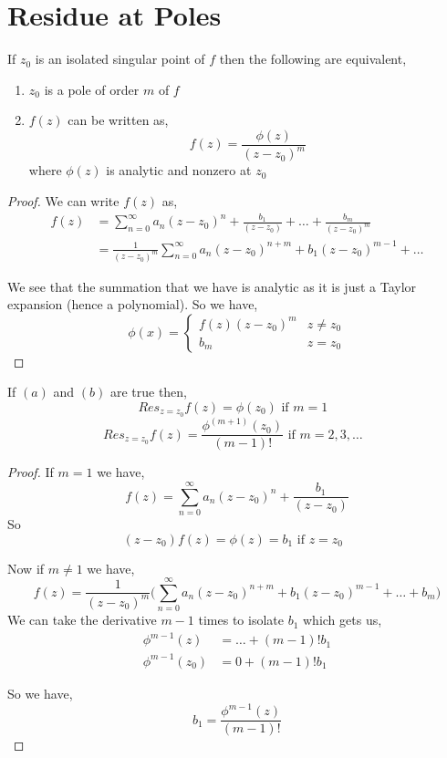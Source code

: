 \section{Residue at Poles}
\begin{theorem}
   If $z_0$ is an isolated singular point of $f$ then the following are equivalent, 
   \begin{enumerate}
      \item $z_0$ is a pole of order $m$ of $f$ 
      \item $f(z) $ can be written as, 
      $$ f(z) = \frac{\phi(z)}{(z - z_0)^{m}} $$ 
      where $\phi(z)$ is analytic and nonzero at $z_0$
   \end{enumerate}
\end{theorem}
\begin{proof}
   We can write $f(z)$ as, 
   \begin{align*}
      f(z) &= \sum_{n=0}^{\infty} a_n(z - z_0)^{n} + \frac{b_1}{(z - z_0)} + \dots + \frac{b_m}{(z - z_0)^{m}}\\
           &= \frac{1}{(z - z_0)^{m}} \sum_{n=0}^{\infty} a_n(z - z_0)^{n+m} + b_1(z - z_0)^{m-1} + \dots
   \end{align*}

   We see that the summation that we have is analytic as it is just a Taylor expansion (hence a polynomial). So we have, 
   $$ \phi(x) = \begin{cases} f(z) (z - z_0)^{m} &  z \ne z_0 \\ b_m &  z = z_0 \end{cases}  $$ 


\end{proof}

\begin{theorem}
   If $(a)$ and $(b)$ are true then, 
   $$ Res_{z = z_0} f(z) = \phi(z_0)\text{ if $m = 1$ }$$
   $$ Res_{z = z_0} f(z) = \frac{\phi^{(m+1)}(z_0)}{(m-1)!} \text{ if $m = 2,3,\dots$ }$$
\end{theorem}

\begin{proof}
   If $m = 1$ we have, 
   $$ f(z) = \sum_{n=0}^{\infty} a_n(z - z_0)^{n} + \frac{b_1}{(z - z_0)} $$ 
   So 
   $$ (z - z_0)f(z) =\phi(z) = b_1 \text{ if $z = z_0$ } $$


   Now if $m \ne 1$ we have, 
   $$ f(z) = \frac{1}{(z - z_0)^{m}} \bigg ( \sum_{n=0}^{\infty} a_n(z - z_0)^{n + m} + b_1(z - z_0)^{m - 1} + \dots + b_m \bigg) $$ 
   We can take the derivative $m - 1$ times to isolate $b_1$ which gets us, 
   \begin{align*}
      \phi^{m-1}(z) &= \dots + (m-1)! b_1 \\
      \phi^{m-1}(z_0) &=0 + (m-1)! b_1  
   \end{align*}

   So we have, 
   $$ b_1 = \frac{\phi^{m -1}(z)}{(m - 1)!} $$ 
\end{proof}


